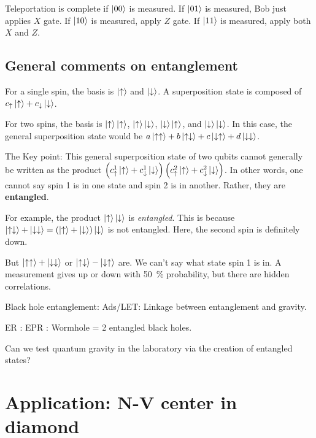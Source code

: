 \documentclass[12pt, english]{book}
\begin{document}
Teleportation is complete if $\ket{00}$ is measured.
If $\ket{01}$ is measured, Bob just applies $X$ gate.
If $\ket{10}$ is measured, apply $Z$ gate.
If $\ket{11}$ is measured, apply both $X$ and $Z$.

\subsection{General comments on entanglement}

For a single spin, the basis is $\ket{\uparrow}$ and $\ket{\downarrow}$.
A superposition state is composed of $c_{\uparrow} \ket{\uparrow} + c_{\downarrow} \ket{\downarrow}$.

For two spins, the basis is $\ket{\uparrow} \ket{\uparrow}$, $\ket{\uparrow} \ket{\downarrow}$, $\ket{\downarrow} \ket{\uparrow}$, and $\ket{\downarrow} \ket{\downarrow}$.
In this case, the general superposition state would be $a \ket{\uparrow \uparrow} + b \ket{\uparrow \downarrow} + c \ket{\downarrow \uparrow} + d \ket{\downarrow \downarrow}$.

The Key point: This general superposition state of two qubits cannot generally be written as the product $\left( c_{\uparrow}^1 \ket{\uparrow} + c_{\downarrow}^1 \ket{\downarrow} \right) \left( c_{\uparrow}^2 \ket{\uparrow} + c_{\downarrow}^2 \ket{\downarrow} \right)$.
In other words, one cannot say spin 1 is in one state and spin 2 is in another.
Rather, they are \textbf{entangled}.

For example, the product $\ket{\uparrow} \ket{\downarrow}$ is \emph{entangled}.
This is because $\ket{\uparrow \downarrow} + \ket{\downarrow \downarrow} = \left( \ket{\uparrow} + \ket{\downarrow} \right) \ket{\downarrow}$ is not entangled.
Here, the second spin is definitely down.

But $\ket{\uparrow \uparrow} + \ket{\downarrow \downarrow}$ or $\ket{\uparrow \downarrow} - \ket{\downarrow \uparrow}$ are. 
We can't say what state spin 1 is in.
A measurement gives up or down with \SI{50}{\percent} probability, but there are hidden correlations.

Black hole entanglement: Ads/LET: Linkage between entanglement and gravity.

ER : EPR : Wormhole = 2 entangled black holes.

Can we test quantum gravity in the laboratory via the creation of entangled states?

\section{Application: N-V center in diamond}
\end{document}

